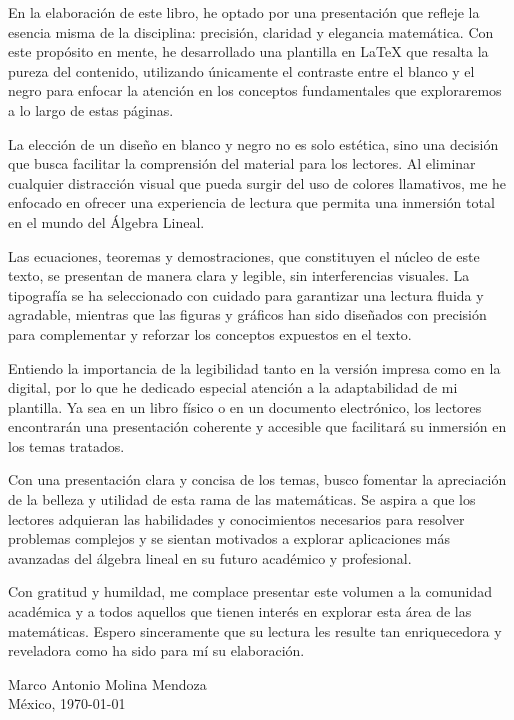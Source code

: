En la elaboración de este libro, he optado por una presentación que refleje la esencia misma de la disciplina: precisión, claridad y elegancia matemática. Con este propósito en mente, he desarrollado una plantilla en LaTeX que resalta la pureza del contenido, utilizando únicamente el contraste entre el blanco y el negro para enfocar la atención en los conceptos fundamentales que exploraremos a lo largo de estas páginas.

La elección de un diseño en blanco y negro no es solo estética, sino una decisión que busca facilitar la comprensión del material para los lectores. Al eliminar cualquier distracción visual que pueda surgir del uso de colores llamativos, me he enfocado en ofrecer una experiencia de lectura que permita una inmersión total en el mundo del Álgebra Lineal.

Las ecuaciones, teoremas y demostraciones, que constituyen el núcleo de este texto, se presentan de manera clara y legible, sin interferencias visuales. La tipografía se ha seleccionado con cuidado para garantizar una lectura fluida y agradable, mientras que las figuras y gráficos han sido diseñados con precisión para complementar y reforzar los conceptos expuestos en el texto.

Entiendo la importancia de la legibilidad tanto en la versión impresa como en la digital, por lo que he dedicado especial atención a la adaptabilidad de mi plantilla. Ya sea en un libro físico o en un documento electrónico, los lectores encontrarán una presentación coherente y accesible que facilitará su inmersión en los temas tratados.

Con una presentación clara y concisa de los temas, busco fomentar la apreciación de la belleza y utilidad de esta rama de las matemáticas. Se aspira a que los lectores adquieran las habilidades y conocimientos necesarios para resolver problemas complejos y se sientan motivados a explorar aplicaciones más avanzadas del álgebra lineal en su futuro académico y profesional.

Con gratitud y humildad, me complace presentar este volumen a la comunidad académica y a todos aquellos que tienen interés en explorar esta área de las matemáticas. Espero sinceramente que su lectura les resulte tan enriquecedora y reveladora como ha sido para mí su elaboración.

\begin{flushright}
    Marco Antonio Molina Mendoza\\ 
    México, \today\\ 
\end{flushright}